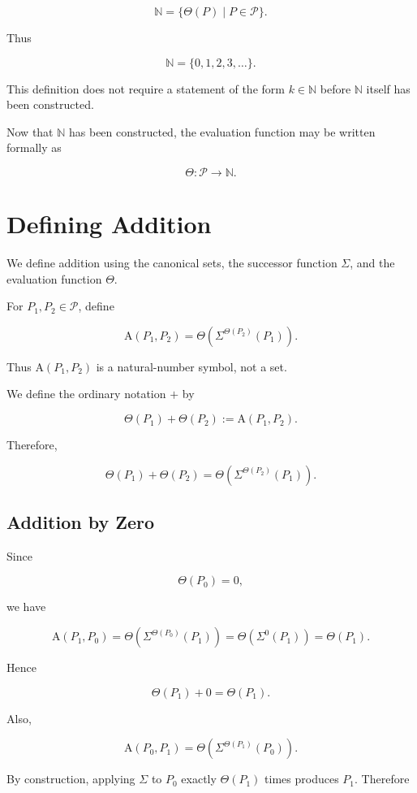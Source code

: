 \documentclass[12pt]{article}
\newcommand{\Alpha}{\mathrm{A}}
\begin{document}
\[
\mathbb N
=
\{\Theta(P)\mid P\in\mathcal P\}.
\]

Thus

\[
\boxed{
\mathbb N=\{0,1,2,3,\ldots\}.
}
\]

This definition does not require a statement of the form \(k\in\mathbb N\) before \(\mathbb N\) itself has been constructed.

Now that \(\mathbb N\) has been constructed, the evaluation function may be written formally as

\[
\boxed{
\Theta:\mathcal P\to\mathbb N.
}
\]

\section*{Defining Addition}

We define addition using the canonical sets, the successor function \(\Sigma\), and the evaluation function \(\Theta\).

For \(P_1,P_2\in\mathcal P\), define

\[
\boxed{
\Alpha(P_1,P_2)
=
\Theta\left(\Sigma^{\Theta(P_2)}(P_1)\right).
}
\]

Thus \(\Alpha(P_1,P_2)\) is a natural-number symbol, not a set.

We define the ordinary notation \(+\) by

\[
\boxed{
\Theta(P_1)+\Theta(P_2)
:=
\Alpha(P_1,P_2).
}
\]

Therefore,

\[
\Theta(P_1)+\Theta(P_2)
=
\Theta\left(\Sigma^{\Theta(P_2)}(P_1)\right).
\]

\subsection*{Addition by Zero}

Since

\[
\Theta(P_0)=0,
\]

we have

\[
\Alpha(P_1,P_0)
=
\Theta\left(\Sigma^{\Theta(P_0)}(P_1)\right)
=
\Theta(\Sigma^0(P_1))
=
\Theta(P_1).
\]

Hence

\[
\boxed{
\Theta(P_1)+0=\Theta(P_1).
}
\]

Also,

\[
\Alpha(P_0,P_1)
=
\Theta\left(\Sigma^{\Theta(P_1)}(P_0)\right).
\]

By construction, applying \(\Sigma\) to \(P_0\) exactly \(\Theta(P_1)\) times produces \(P_1\). Therefore
\end{document}
